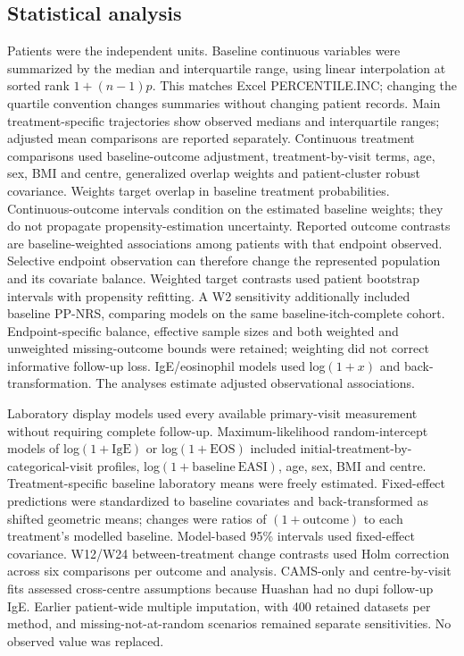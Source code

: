 \documentclass[10pt,a4paper]{article}
\begin{document}
\subsection{Statistical analysis}
Patients were the independent units. Baseline continuous variables were summarized by the median and interquartile range, using linear interpolation at sorted rank $1+(n-1)p$. This matches Excel PERCENTILE.INC; changing the quartile convention changes summaries without changing patient records. Main treatment-specific trajectories show observed medians and interquartile ranges; adjusted mean comparisons are reported separately. Continuous treatment comparisons used baseline-outcome adjustment, treatment-by-visit terms, age, sex, BMI and centre, generalized overlap weights and patient-cluster robust covariance. Weights target overlap in baseline treatment probabilities. Continuous-outcome intervals condition on the estimated baseline weights; they do not propagate propensity-estimation uncertainty. Reported outcome contrasts are baseline-weighted associations among patients with that endpoint observed. Selective endpoint observation can therefore change the represented population and its covariate balance.\citep{lili2019} Weighted target contrasts used patient bootstrap intervals with propensity refitting. A W2 sensitivity additionally included baseline PP-NRS, comparing models on the same baseline-itch-complete cohort. Endpoint-specific balance, effective sample sizes and both weighted and unweighted missing-outcome bounds were retained; weighting did not correct informative follow-up loss. IgE/eosinophil models used log$(1+x)$ and back-transformation. The analyses estimate adjusted observational associations.

Laboratory display models used every available primary-visit measurement without requiring complete follow-up. Maximum-likelihood random-intercept models of log$(1+\mathrm{IgE})$ or log$(1+\mathrm{EOS})$ included initial-treatment-by-categorical-visit profiles, log$(1+\mathrm{baseline\ EASI})$, age, sex, BMI and centre. Treatment-specific baseline laboratory means were freely estimated. Fixed-effect predictions were standardized to baseline covariates and back-transformed as shifted geometric means; changes were ratios of $(1+\mathrm{outcome})$ to each treatment's modelled baseline. Model-based 95\% intervals used fixed-effect covariance. W12/W24 between-treatment change contrasts used Holm correction across six comparisons per outcome and analysis. CAMS-only and centre-by-visit fits assessed cross-centre assumptions because Huashan had no dupi follow-up IgE. Earlier patient-wide multiple imputation, with 400 retained datasets per method, and missing-not-at-random scenarios remained separate sensitivities. No observed value was replaced.\citep{sterne2009mi,wijesuriya2025longitudinal}
\end{document}
